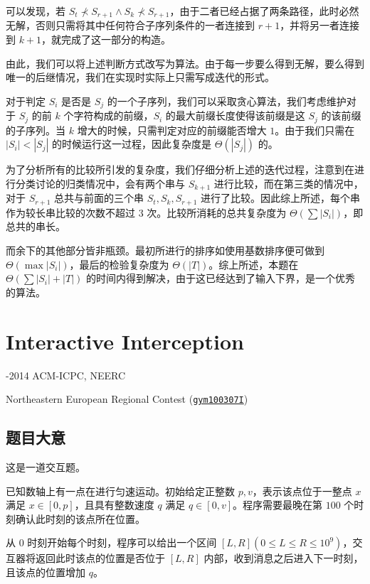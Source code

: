 \documentclass[12pt]{ctexart}
\begin{document}
可以发现，若 $S_t\nprec S_{r+1} \wedge S_k \nprec S_{r+1}$，由于二者已经占据了两条路径，此时必然无解，否则只需将其中任何符合子序列条件的一者连接到 $r+1$，并将另一者连接到 $k+1$，就完成了这一部分的构造。

由此，我们可以将上述判断方式改写为算法。由于每一步要么得到无解，要么得到唯一的后继情况，我们在实现时实际上只需写成迭代的形式。

对于判定 $S_i$ 是否是 $S_j$ 的一个子序列，我们可以采取贪心算法，我们考虑维护对于 $S_j$ 的前 $k$ 个字符构成的前缀，$S_i$ 的最大前缀长度使得该前缀是这 $S_j$ 的该前缀的子序列。当 $k$ 增大的时候，只需判定对应的前缀能否增大 $1$。由于我们只需在 $|S_i|<|S_j|$ 的时候运行这一过程，因此复杂度是 $\Theta(|S_j|)$ 的。

为了分析所有的比较所引发的复杂度，我们仔细分析上述的迭代过程，注意到在进行分类讨论的归类情况中，会有两个串与 $S_{k+1}$ 进行比较，而在第三类的情况中，对于 $S_{r+1}$ 总共与前面的三个串 $S_t,S_k,S_{r+1}$ 进行了比较。因此综上所述，每个串作为较长串比较的次数不超过 $3$ 次。比较所消耗的总共复杂度为 $\Theta(\sum |S_i|)$，即总共的串长。

而余下的其他部分皆非瓶颈。最初所进行的排序如使用基数排序便可做到 $\Theta(\max |S_i|)$，最后的检验复杂度为 $\Theta(|T|)$。综上所述，本题在 $\Theta(\sum |S_i| + |T|)$ 的时间内得到解决，由于这已经达到了输入下界，是一个优秀的算法。

\newpage

\section{Interactive Interception}

\begin{source}-2014 ACM-ICPC, NEERC

Northeastern European Regional Contest (\href{https://codeforces.com/gym/100307}{\texttt{gym100307I}})
\end{source}

\subsection{题目大意}

这是一道交互题。

已知数轴上有一点在进行匀速运动。初始给定正整数 $p,v$，表示该点位于一整点 $x$ 满足 $x \in [0,p]$，且具有整数速度 $q$ 满足 $q\in [0,v]$。程序需要最晚在第 $100$ 个时刻确认此时刻的该点所在位置。

从 $0$ 时刻开始每个时刻，程序可以给出一个区间 $[L, R](0\le L\le R\le 10^9)$，交互器将返回此时该点的位置是否位于 $[L,R]$ 内部，收到消息之后进入下一时刻，且该点的位置增加 $q$。
\end{document}
